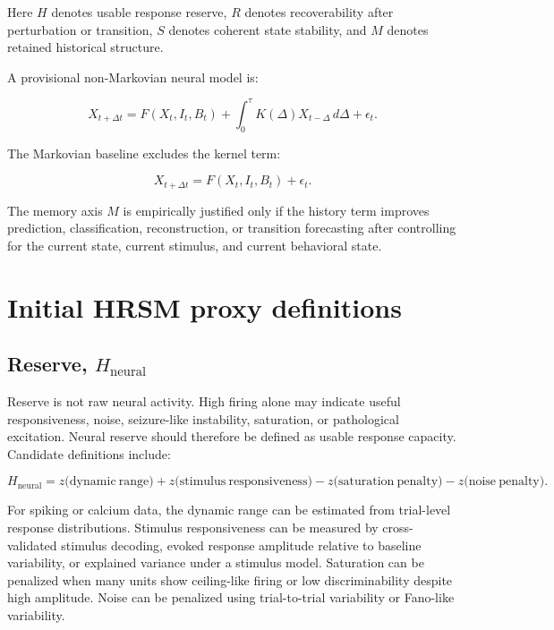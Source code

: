 \documentclass[11pt]{article}
\begin{document}
Here $H$ denotes usable response reserve, $R$ denotes recoverability after perturbation or transition, $S$ denotes coherent state stability, and $M$ denotes retained historical structure.

A provisional non-Markovian neural model is:

\begin{equation}
X_{t+\Delta t} = F(X_t, I_t, B_t) + \int_0^\tau K(\Delta)X_{t-\Delta}\,d\Delta + \epsilon_t.
\end{equation}

The Markovian baseline excludes the kernel term:

\begin{equation}
X_{t+\Delta t} = F(X_t, I_t, B_t) + \epsilon_t.
\end{equation}

The memory axis $M$ is empirically justified only if the history term improves prediction, classification, reconstruction, or transition forecasting after controlling for the current state, current stimulus, and current behavioral state.

\section{Initial HRSM proxy definitions}

\subsection{Reserve, $H_{\mathrm{neural}}$}

Reserve is not raw neural activity. High firing alone may indicate useful responsiveness, noise, seizure-like instability, saturation, or pathological excitation. Neural reserve should therefore be defined as usable response capacity. Candidate definitions include:

\begin{equation}
H_{\mathrm{neural}} = z\bigl(\mathrm{dynamic\ range}\bigr) + z\bigl(\mathrm{stimulus\ responsiveness}\bigr) - z\bigl(\mathrm{saturation\ penalty}\bigr) - z\bigl(\mathrm{noise\ penalty}\bigr).
\end{equation}

For spiking or calcium data, the dynamic range can be estimated from trial-level response distributions. Stimulus responsiveness can be measured by cross-validated stimulus decoding, evoked response amplitude relative to baseline variability, or explained variance under a stimulus model. Saturation can be penalized when many units show ceiling-like firing or low discriminability despite high amplitude. Noise can be penalized using trial-to-trial variability or Fano-like variability.
\end{document}
